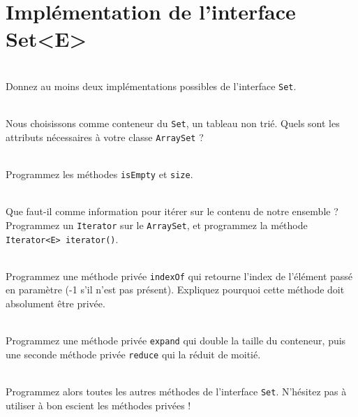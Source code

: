 \documentclass[iutinfo,a4paper,nocorrections,10pt]{ustl-tdtp}
\begin{document}
\section{Implémentation de l'interface Set<E>}

~\\ \question Donnez au moins deux implémentations possibles de l'interface \texttt{Set}.

~\\ \question Nous choisissons comme conteneur du \texttt{Set}, un tableau non trié. 
Quels sont les attributs nécessaires à votre classe \texttt{ArraySet} ?

~\\ \question Programmez les méthodes \texttt{isEmpty} et \texttt{size}.

~\\ \question Que faut-il comme information pour itérer sur le contenu de notre ensemble ? Programmez un \texttt{Iterator} sur le \texttt{ArraySet}, et programmez la méthode \texttt{Iterator<E> iterator()}.

~\\ \question Programmez une méthode privée \texttt{indexOf} qui retourne l'index de l'élément passé en paramètre (-1 s'il n'est pas présent). Expliquez pourquoi cette méthode doit absolument être privée.

~\\ \question Programmez une méthode privée \texttt{expand} qui double la taille du conteneur, puis une seconde méthode privée \texttt{reduce} qui la réduit de moitié.

~\\ \question Programmez alors toutes les autres méthodes de l'interface \texttt{Set}. N'hésitez pas à utiliser à bon escient les méthodes privées !
\end{document}
